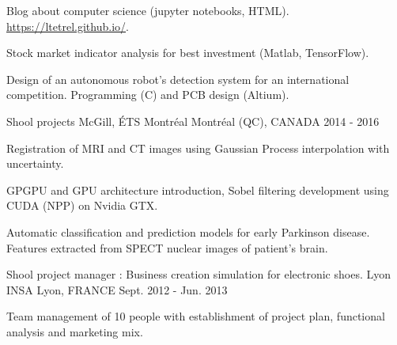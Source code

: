 


\begin{cventries}


\cventry
{} %
{} %
{} %
{} %
{ %
\vspace{-5mm}
\begin{cvitems}
\item {Blog about computer science (jupyter notebooks, HTML). \url{https://ltetrel.github.io/}.}
\item {Stock market indicator analysis for best investment (Matlab, TensorFlow).}
\item {Design of an autonomous robot's detection system for an international competition. Programming (C) and PCB design (Altium).}
\end{cvitems}
}


\cventry
{Shool projects} %
{McGill, ÉTS Montréal} %
{\hspace{-5mm}Montréal (QC), CANADA} %
{2014 - 2016} %
{ %
\begin{cvitems}
\item {Registration of MRI and CT images using Gaussian Process interpolation with uncertainty.}
\item {GPGPU and GPU architecture introduction, Sobel filtering development using CUDA (NPP) on Nvidia GTX.}
\item {Automatic classification and prediction models for early Parkinson disease. Features extracted from SPECT nuclear images of patient's brain.}
\end{cvitems}
}


\cventry
{Shool project manager : Business creation simulation for electronic shoes.} %
{Lyon INSA} %
{Lyon, FRANCE} %
{Sept. 2012 - Jun. 2013} %
{ %
\begin{cvitems}
\item {Team management of 10 people with establishment of project plan, functional analysis and marketing mix.}
\end{cvitems}
}


\end{cventries}
